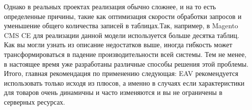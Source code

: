 \documentclass[10pt, a5paper]{article}
\begin{document}
Однако в реальных проектах реализация обычно сложнее, и на то есть определенные причины, такие как оптимизация скорости обработки запросов и уменьшение общего количества записей в таблицах.Так, например, в Magento CMS CE для реализации данной модели используется больше десятка таблиц. Как вы могли узнать из описание недостатков выше, иногда гибкость может трансформироваться в падение производительности всей системы. Тем не менее, в настоящее время уже разработаны различные способы решения этой проблемы. Итого, главная рекомендация по применению следующая: EAV рекомендуется использовать только исходя из плюсов, а именно в случаях если характеристики для товаров очень динамичны и часто изменяются и вы не ограничены в серверных ресурсах.
\end{document}
